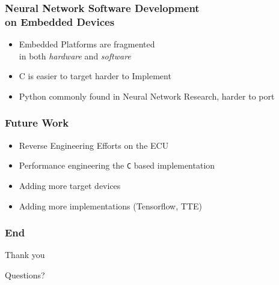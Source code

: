 \documentclass{beamer}
\begin{document}
\begin{frame}
  \frametitle{Neural Network Software Development \\ on Embedded Devices}

  \begin{itemize}
    \item Embedded Platforms are fragmented \\ in both \textit{hardware} and \textit{software}
    \item C is easier to target harder to Implement
    \item Python commonly found in Neural Network Research, harder to port
  \end{itemize}

\end{frame}

\begin{frame}
  \frametitle{Future Work}

  \begin{itemize}
    \item Reverse Engineering Efforts on the ECU
    \item Performance engineering the \texttt{C} based implementation
    \item Adding more target devices
    \item Adding more implementations (Tensorflow, TTE)
  \end{itemize}

\end{frame}


\begin{frame}
  \frametitle{End}

  \centerline{{\Large Thank you}} 
  \vspace*{1em}
  \centerline{{\Large Questions?}}

\end{frame}
\end{document}
